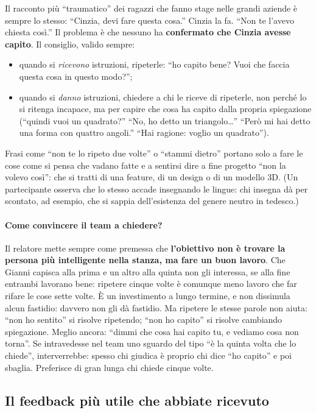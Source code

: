 Il racconto più ``traumatico'' dei ragazzi che fanno stage nelle grandi
aziende è sempre lo stesso: ``Cinzia, devi fare questa cosa.'' Cinzia la fa.
``Non te l'avevo chiesta così.'' Il problema è che nessuno ha
\textbf{confermato che Cinzia avesse capito}. Il consiglio, valido sempre:
\begin{itemize}
  \item quando si \emph{ricevono} istruzioni, ripeterle: ``ho capito bene?
        Vuoi che faccia questa cosa in questo modo?'';
  \item quando si \emph{danno} istruzioni, chiedere a chi le riceve di
        ripeterle, non perché lo si ritenga incapace, ma per capire che cosa
        ha capito dalla propria spiegazione (``quindi vuoi un quadrato?''
        ``No, ho detto un triangolo\dots'' ``Però mi hai detto una forma con
        quattro angoli.'' ``Hai ragione: voglio un quadrato'').
\end{itemize}
Frasi come ``non te lo ripeto due volte'' o ``stammi dietro'' portano solo a
fare le cose come si pensa che vadano fatte e a sentirsi dire a fine progetto
``non la volevo così'': che si tratti di una feature, di un design o di un
modello 3D. (Un partecipante osserva che lo stesso accade insegnando le lingue:
chi insegna dà per scontato, ad esempio, che si sappia dell'esistenza del
genere neutro in tedesco.)

\paragraph{Come convincere il team a chiedere?} Il relatore mette sempre come
premessa che \textbf{l'obiettivo non è trovare la persona più intelligente
nella stanza, ma fare un buon lavoro}. Che Gianni capisca alla prima e un altro
alla quinta non gli interessa, se alla fine entrambi lavorano bene: ripetere
cinque volte è comunque meno lavoro che far rifare le cose sette volte. È un
investimento a lungo termine, e non dissimula alcun fastidio: davvero non gli
dà fastidio. Ma ripetere le stesse parole non aiuta: ``non ho sentito'' si
risolve ripetendo; ``non ho capito'' si risolve cambiando spiegazione. Meglio
ancora: ``dimmi che cosa hai capito tu, e vediamo cosa non torna''. Se
intravedesse nel team uno sguardo del tipo ``è la quinta volta che lo
chiede'', interverrebbe: spesso chi giudica è proprio chi dice ``ho capito'' e
poi sbaglia. Preferisce di gran lunga chi chiede cinque volte.

\subsection{Il feedback più utile che abbiate ricevuto}

